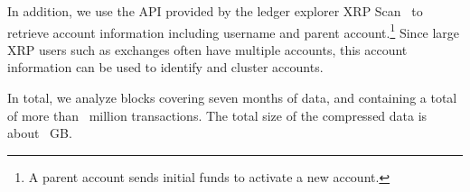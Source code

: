 In addition, we use the API provided by the ledger explorer XRP Scan~\cite{xrpscan} to retrieve account information including username and parent account.\footnote{A parent account sends initial funds to activate a new account.} 
Since large XRP users such as exchanges often have multiple accounts, this account information can be used to identify and cluster accounts.

In total, we analyze \blockscount{\XRPStartBlock}{\XRPEndBlock} blocks covering seven months of data, and containing a total of more than~ million transactions. The total size of the compressed data is about~ GB.










